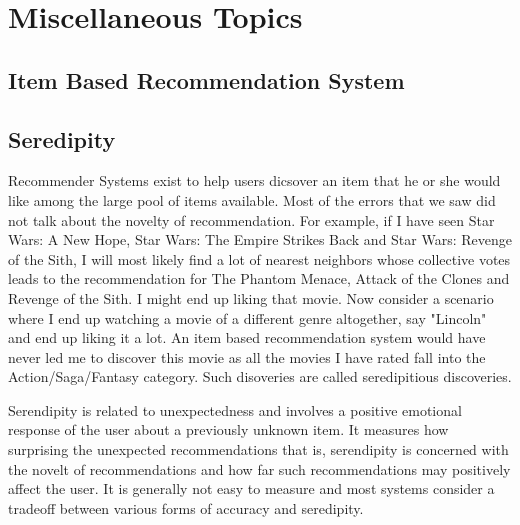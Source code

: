 \documentclass{article}
\begin{document}
  \section{Miscellaneous Topics}
  \subsection{Item Based Recommendation System}
  \subsection{Seredipity}
  Recommender Systems exist to help users dicsover an item that he or she would like among the large pool of items available. Most of the errors that we saw did not talk about the novelty of recommendation. For example, if I have seen Star Wars: A New Hope, Star Wars: The Empire Strikes Back and Star Wars: Revenge of the Sith, I will most likely find a lot of nearest neighbors whose collective votes leads to the recommendation for The Phantom Menace, Attack of the Clones and Revenge of the Sith. I might end up liking that movie. Now consider a scenario where I end up watching a movie of a different genre altogether, say "Lincoln" and end up liking it a lot. An item based recommendation system would have never led me to discover this movie as all the movies I have rated fall into the Action/Saga/Fantasy category. Such disoveries are called seredipitious discoveries. 

Serendipity is related to unexpectedness and involves a positive emotional response of the user about a previously unknown item. It measures how surprising the unexpected recommendations that is, serendipity is concerned with the novelt of recommendations and how far such recommendations may positively affect the user. It is generally not easy to measure and most systems consider a tradeoff between various forms of accuracy and seredipity. 
\end{document}
